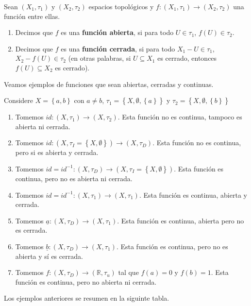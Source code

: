 \documentclass[12pt]{report}
\theoremstyle{largebreak}
\newcommand\cf[3]{\ensuremath{#1:#2\rightarrow#3}}
\begin{document}
    \begin{mydef}
        Sean $(X_1,\tau_1)$ y $(X_2,\tau_2)$ espacios topológicos y $\cf{f}{(X_1,\tau_1)}{(X_2,\tau_2)}$ una función entre ellas.
        \begin{enumerate}
            \item Decimos que $f$ es una \textbf{función abierta}, si para todo $U\in\tau_1$, $f(U)\in\tau_2$.
            \item Decimos que $f$ es una \textbf{función cerrada}, si para todo $X_1-U\in\tau_1$, $X_2-f(U)\in\tau_2$ (en otras palabras, si $U\subseteq X_1$ es cerrado, entonces $f(U)\subseteq X_2$ es cerrado).
        \end{enumerate}
    \end{mydef}

    Veamos ejemplos de funciones que sean abiertas, cerradas y continuas.

    Considere $X=\left\{a,b \right\}$ con $a\neq b$, $\tau_1=\left\{ X,\emptyset,\left\{a\right\} \right\}$ y $\tau_2=\left\{ X,\emptyset,\left\{b\right\} \right\}$

    \begin{enumerate}
        \item Tomemos $\cf{id}{(X,\tau_1)}{(X,\tau_2)}$. Esta función no es continua, tampoco es abierta ni cerrada.
        \item Tomemos $\cf{id}{(X,\tau_I=\left\{X,\emptyset \right\})}{(X,\tau_D)}$. Esta función no es continua, pero si es abierta y cerrada.
        \item Tomemos $\cf{id=id^{-1}}{(X,\tau_D)}{(X,\tau_I=\left\{X,\emptyset \right\})}$. Esta función es continua, pero no es abierta ni cerrada.
        \item Tomemos $\cf{id=id^{-1}}{(X,\tau_1)}{(X,\tau_1)}$. Esta función es continua, abierta y cerrada.
        \item Tomemos $\cf{\underline{a}}{(X,\tau_D)}{(X,\tau_1)}$. Esta función es continua, abierta pero no es cerrada.
        \item Tomemos $\cf{\underline{b}}{(X,\tau_D)}{(X,\tau_1)}$. Esta función es continua, pero no es abierta y sí es cerrada.
        \item Tomemos $\cf{f}{(X,\tau_D)}{(\mathbb{R},\tau_u)}$ tal que $f(a)=0$ y $f(b)=1$. Esta función es continua, pero no abierta ni cerrada.
    \end{enumerate}

    Los ejemplos anteriores se resumen en la siguinte tabla.
\end{document}
